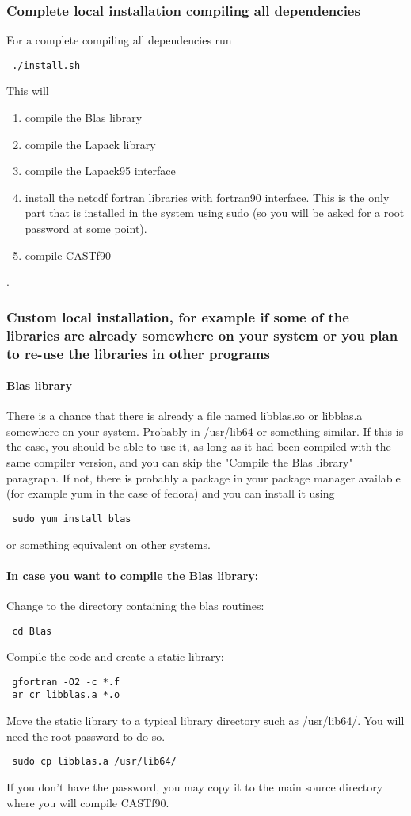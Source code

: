 \documentclass[11p,a4paper]{article}
\begin{document}
\subsubsection{Complete local installation compiling all dependencies}
For a complete compiling all dependencies run
\begin{verbatim}
 ./install.sh
\end{verbatim}
This will 
\begin{enumerate}
 \item compile the Blas library
 \item compile the Lapack library
 \item compile the Lapack95 interface
 \item install the netcdf fortran libraries with fortran90 interface. This is the only part that is installed in the system using sudo (so you will be asked for a root password at some point).
 \item compile CASTf90
\end{enumerate}.
\subsubsection{Custom local installation, for example if some of the libraries are already somewhere on your system or you plan to re-use the libraries in other programs}
\paragraph{Blas library}
There is a chance that there is already a file named libblas.so or libblas.a somewhere on your system. Probably in /usr/lib64 or something similar. If this is the case, you should be able to use it, as long as it had been compiled with the same compiler version, and you can skip the "Compile the Blas library" paragraph. If not, there is probably a package in your package manager available (for example yum in the case of fedora) and you can install it using
\begin{verbatim}
 sudo yum install blas
\end{verbatim}
or something equivalent on other systems.
\paragraph{In case you want to compile the Blas library:}
Change to the directory containing the blas routines:
\begin{verbatim}
 cd Blas
\end{verbatim}
Compile the code and create a static library:
\begin{verbatim}
 gfortran -O2 -c *.f
 ar cr libblas.a *.o
\end{verbatim}
Move the static library to a typical library directory such as /usr/lib64/. You will need the root password to do so.
\begin{verbatim}
 sudo cp libblas.a /usr/lib64/
\end{verbatim}
If you don't have the password, you may copy it to the main source directory where you will compile CASTf90.
\end{document}
